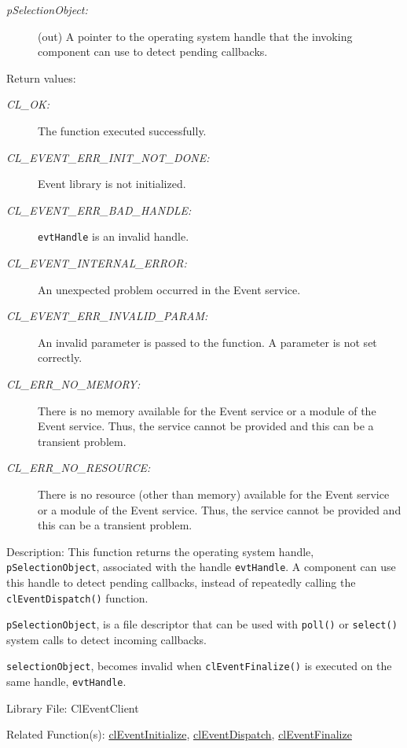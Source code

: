 \begin{flushleft}
\begin{Desc}
\begin{description}
\item[{\em p\-Selection\-Object:}](out) A pointer to the operating system handle that the invoking component can use to detect pending callbacks. 
\end{description}
\end{Desc}
\begin{Desc}
\item[Return values:]
\begin{description}
\item[{\em CL\_\-OK:}]The function executed successfully. 
\item[{\em CL\_\-EVENT\_\-ERR\_\-INIT\_\-NOT\_\-DONE:}]Event library is not initialized. 
\item[{\em CL\_\-EVENT\_\-ERR\_\-BAD\_\-HANDLE:}] {\tt{evtHandle}} is an invalid handle.
\item[{\em CL\_\-EVENT\_\-INTERNAL\_\-ERROR:}]An unexpected problem occurred in the Event service. 
\item[{\em CL\_\-EVENT\_\-ERR\_\-INVALID\_\-PARAM:}]An invalid parameter is passed to the function. A parameter is not set correctly.
\item[{\em CL\_\-ERR\_\-NO\_\-MEMORY:}]There is no memory available for the Event service or a module of the Event service. Thus, the service cannot be 
provided and this can be a transient problem.
\item[{\em CL\_\-ERR\_\-NO\_\-RESOURCE:}]There is no resource (other than memory) available for the Event service or a module of the Event service. Thus,
the service cannot be provided and this can be a transient problem.
\end{description}
\end{Desc}
\begin{Desc}
\item[Description:]
This function returns the operating system handle, {\tt{pSelectionObject}}, associated with the handle {\tt{evtHandle}}. A component can use this handle
to detect pending callbacks, instead of repeatedly calling the {\tt{clEventDispatch()}} function.
\par
{\tt{pSelectionObject}}, is a file descriptor that can be used with {\tt{poll()}} or {\tt{select()}} system calls to detect incoming callbacks. 
\par
{\tt{selectionObject}}, becomes invalid when {\tt{clEventFinalize()}} is executed on the same handle, {\tt{evtHandle}}. 
\end{Desc}
\begin{Desc}
\item[Library File:]Cl\-Event\-Client\end{Desc}
\begin{Desc}
\item[Related Function(s):]\hyperlink{pageem101}{cl\-Event\-Initialize}, \hyperlink{pageem118}{cl\-Event\-Dispatch}, 
\hyperlink{pageem102}{cl\-Event\-Finalize} \end{Desc}
\newpage



\end{flushleft}
